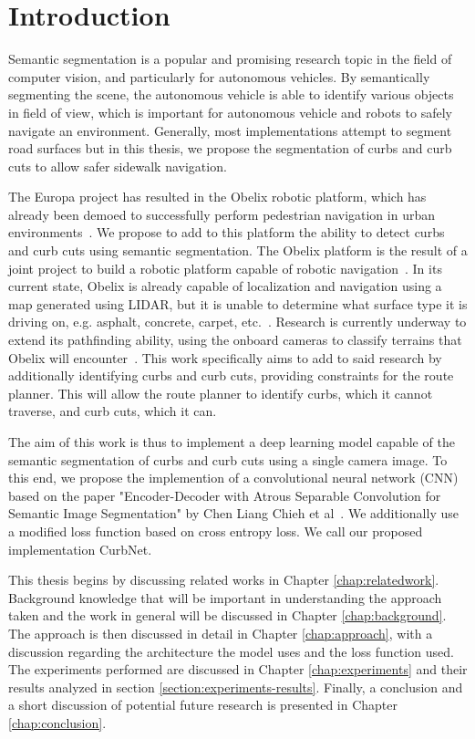 \chapter{Introduction}\label{chap:introduction}
Semantic segmentation is a popular and promising research topic in the field of computer vision, and particularly for autonomous vehicles.
By semantically segmenting the scene, the autonomous vehicle is able to identify various objects in field of view, which is important for autonomous vehicle and robots to safely navigate an environment.
Generally, most implementations attempt to segment road surfaces but in this thesis, we propose the segmentation of curbs and curb cuts to allow safer sidewalk navigation.

The Europa project has resulted in the Obelix robotic platform, which has already been demoed to successfully perform pedestrian navigation in urban environments~\cite{europa}\cite{obelix-slam}.
We propose to add to this platform the ability to detect curbs and curb cuts using semantic segmentation.
The Obelix platform is the result of a joint project to build a robotic platform capable of robotic navigation~\cite{europa}. 
In its current state, Obelix is already capable of localization and navigation using a map generated using LIDAR, but it is unable to determine what surface type it is driving on, e.g. asphalt, concrete, carpet, etc.~\cite{jannik}.
Research is currently underway to extend its pathfinding ability, using the onboard cameras to classify terrains that Obelix will encounter~\cite{jannik}.
This work specifically aims to add to said research by additionally identifying curbs and curb cuts, providing constraints for the route planner.
This will allow the route planner to identify curbs, which it cannot traverse, and curb cuts, which it can.



The aim of this work is thus to implement a deep learning model capable of the semantic segmentation of curbs and curb cuts using a single camera image.
To this end, we propose the implemention of a convolutional neural network (CNN) based on the paper "Encoder-Decoder with Atrous Separable Convolution for Semantic Image Segmentation" by Chen Liang Chieh et al~\cite{deeplab}.
We additionally use a modified loss function based on cross entropy loss.
We call our proposed implementation CurbNet.

This thesis begins by discussing related works in Chapter \ref{chap:relatedwork}. 
Background knowledge that will be important in understanding the approach taken and the work in general will be discussed in Chapter \ref{chap:background}.
The approach is then discussed in detail in Chapter \ref{chap:approach}, with a discussion regarding the architecture the model uses and the loss function used.
The experiments performed are discussed in Chapter \ref{chap:experiments} and their results analyzed in section \ref{section:experiments-results}.
Finally, a conclusion and a short discussion of potential future research is presented in Chapter \ref{chap:conclusion}.